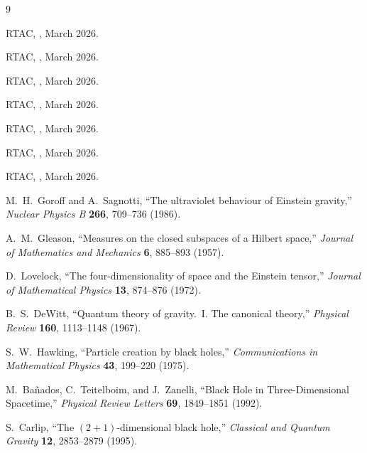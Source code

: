 \documentclass[12pt,a4paper]{article}
\begin{document}
\begin{thebibliography}{9}

 RTAC, , March 2026.

 RTAC, , March 2026.

 RTAC, , March 2026.

 RTAC, , March 2026.

 RTAC, , March 2026.

 RTAC, , March 2026.

 RTAC, , March 2026.

 M.~H.~Goroff and A.~Sagnotti, ``The ultraviolet behaviour
of Einstein gravity,'' \textit{Nuclear Physics B} \textbf{266}, 709--736
(1986).

 A.~M.~Gleason, ``Measures on the closed subspaces of a
Hilbert space,'' \textit{Journal of Mathematics and Mechanics} \textbf{6},
885--893 (1957).

 D.~Lovelock, ``The four-dimensionality of space and the
Einstein tensor,'' \textit{Journal of Mathematical Physics} \textbf{13},
874--876 (1972).

 B.~S.~DeWitt, ``Quantum theory of gravity.~I. The canonical
theory,'' \textit{Physical Review} \textbf{160}, 1113--1148 (1967).

 S.~W.~Hawking, ``Particle creation by black holes,''
\textit{Communications in Mathematical Physics} \textbf{43}, 199--220 (1975).

 M.~Ba\~{n}ados, C.~Teitelboim, and J.~Zanelli, ``Black Hole
in Three-Dimensional Spacetime,'' \textit{Physical Review Letters}
\textbf{69}, 1849--1851 (1992).

 S.~Carlip, ``The $(2+1)$-dimensional black hole,''
\textit{Classical and Quantum Gravity} \textbf{12}, 2853--2879 (1995).

\end{thebibliography}
\end{document}
